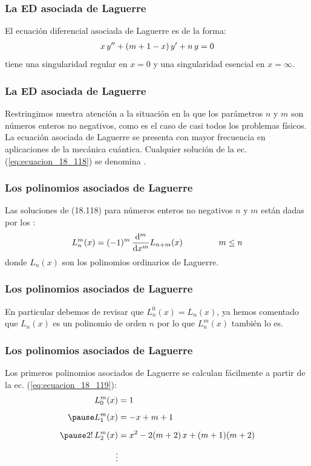 \documentclass[12pt]{beamer}
\begin{document}
\begin{frame}
\frametitle{La ED asociada de Laguerre}
El ecuación diferencial asociada de Laguerre es de la forma:
\pause
\begin{align}
x \, {y}^{\prime \prime} + (m +  1 - x) \, {y}^{\prime} + n \, y = 0
\label{eq:ecuacion_18_118}
\end{align}
tiene una singularidad regular en $x = 0$ y una singularidad esencial en $x = \infty$.
\end{frame}
\begin{frame}
\frametitle{La ED asociada de Laguerre}
Restringimos nuestra atención a la situación en la que los parámetros $n$ y $m$ son números enteros no negativos, como es el caso de casi todos los problemas físicos.
\\
\bigskip
\pause
La ecuación asociada de Laguerre se presenta con mayor frecuencia en aplicaciones de la mecánica cuántica. Cualquier solución de la ec. (\ref{eq:ecuacion_18_118}) se denomina .
\end{frame}
\begin{frame}
\frametitle{Los polinomios asociados de Laguerre}
Las soluciones de (18.118) para números enteros no negativos $n$ y $m$ están dadas por los :
\pause
\begin{align}
L_{n}^{m} (x) = (-1)^{m} \, \dv[m]{x} L_{n+m} (x) \hspace{1.5cm} m \leq n
\label{eq:ecuacion_18_119}
\end{align}
donde $L_{n} (x)$ son los polinomios ordinarios de Laguerre.
\end{frame}
\begin{frame}
\frametitle{Los polinomios asociados de Laguerre}
En particular debemos de revisar que $L_{n}^{0} (x) = L_{n}(x)$, ya hemos comentado que $L_{n}(x)$ es un polinomio de orden $n$ por lo que $L_{n}^{m} (x)$ también lo es.
\end{frame}
\begin{frame}
\frametitle{Los polinomios asociados de Laguerre}
Los primeros polinomios asociados de Laguerre se calculan fácilmente a partir de la ec. (\ref{eq:ecuacion_18_119}):
\pause
\begin{eqnarray*}
\begin{aligned}
L_{0}^{m} (x) &= 1 \\[0.5em] \pause
L_{1}^{m} (x) &= -x + m + 1 \\[0.5em] \pause
2! \, L_{2}^{m} (x) &= x^{2} - 2 (m + 2) \, x + (m + 1)(m + 2) \\[0.5em]
\vdots
\end{aligned}
\end{eqnarray*}
\end{frame}
\end{document}
